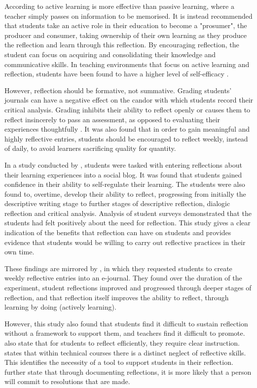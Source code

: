 \documentclass{l4proj}
\begin{document}
According to \citet{bruno_reflective_2018} active learning is more effective than passive learning, where a teacher simply passes on information to be memorised. It is instead recommended that students take an active role in their education to become a "prosumer", the producer and consumer, taking ownership of their own learning as they produce the reflection and learn through this reflection. By encouraging reflection, the student can focus on acquiring and consolidating their knowledge and communicative skills. In teaching environments that focus on active learning and reflection, students have been found to have a higher level of self-efficacy \citep{bruno_reflective_2018}.

However, reflection should be formative, not summative. Grading students’ journals can have a negative effect on the candor with which students record their critical analysis. Grading inhibits their ability to reflect openly or causes them to reflect insincerely to pass an assessment, as opposed to evaluating their experiences thoughtfully \citep{bruno_reflective_2018}. It was also found that in order to gain meaningful and highly reflective entries, students should be encouraged to reflect weekly, instead of daily, to avoid learners sacrificing quality for quantity.

In a study conducted by \citet{mcdermott_developing_nodate}, students were tasked with entering reflections about their learning experiences into a social blog. It was found that students gained confidence in their ability to self-regulate their learning. The students were also found to, overtime, develop their ability to reflect, progressing from initially the descriptive writing stage to further stages of descriptive reflection, dialogic reflection and critical analysis. Analysis of student surveys demonstrated that the students had felt positively about the need for reflection. This study gives a clear indication of the benefits that reflection can have on students and provides evidence that students would be willing to carry out reflective practices in their own time.

These findings are mirrored by \citet{bruno_reflective_2018}, in which they requested students to create weekly reflective entries into an e-journal. They found over the duration of the experiment, student reflections improved and progressed through deeper stages of reflection, and that reflection itself improves the ability to reflect, through learning by doing (actively learning). 

However, this study also found that students find it difficult to sustain reflection without a framework to support them, and teachers find it difficult to promote. \citet{bruno_reflective_2018} also state that for students to reflect efficiently, they require clear instruction. \citet{thurner_development_2020} states that within technical courses there is a distinct neglect of reflective skills. This identifies the necessity of a tool to support students in their reflection. \citet{thurner_development_2020} further state that through documenting reflections, it is more likely that a person will commit to resolutions that are made.
\end{document}
